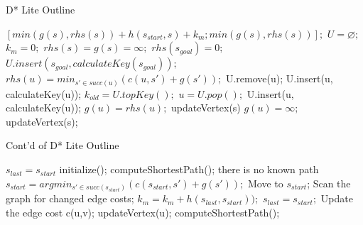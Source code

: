 \documentclass[10pt,journal]{IEEEtran}
\begin{document}
\begin{algorithm}
	\caption{D* Lite Outline}
	\label{algDLite-1}
	{\fontsize{9}{9}\selectfont
    \begin{algorithmic}[1] %
      	\State \Return $[min(g(s), rhs(s)) + h(s_{start},s) + k_{m} ; min(g(s), rhs(s))];$
      \EndFunction
   	  \Statex
      	\State $U = \varnothing;$
      	\State $k_{m} = 0;$
     		\State $rhs(s) = g(s) = \infty;$
     	\EndFor
      	\State $rhs(s_{goal}) = 0;$
      	\State $U.insert(s_{goal}, calculateKey(s_{goal}));$
	  \EndFunction
	  \Statex
   	  		\State $rhs(u) = min_{s' \in succ(u)}(c(u,s') + g(s'));$
   	  	\EndIf
   	  	 U.remove(u); \EndIf
   	  		\State U.insert(u, calculateKey(u));
   	  	\EndIf
   	  \EndFunction
	  \Statex	  
      		\State $k_{old} = U.topKey();$
      		\State $u = U.pop();$
   		  		\State U.insert(u, calculateKey(u));
    	      	\State $g(u) = rhs(u);$
				 updateVertex(s) \EndFor
			\Else
				\State $g(u) = \infty;$
				 updateVertex(s); \EndFor
	   	  	\EndIf
      	\EndWhile  	  
  	  \EndFunction
    \end{algorithmic}}
\end{algorithm}

\begin{algorithm}
	\caption{Cont'd of D* Lite Outline}
	\label{algDLite-2}
	{\fontsize{9}{9}\selectfont
    \begin{algorithmic}[1] %
	  	\State $s_{last} = s_{start}$
      	\State initialize();
      	\State computeShortestPath();
			 there is no known path \EndIf
			\State $s_{start} = argmin_{s' \in succ(s_{start})}(c(s_{start},s') + g(s'));$
			\State Move to $s_{start}$;
   	      	\State Scan the graph for changed edge costs;
    	      		\State $k_{m} = k_{m} + h(s_{last}, s_{start}));$
      			  	\State $s_{last} = s_{start};$
    	      			\State Update the edge cost c(u,v);
    	      			\State updateVertex(u);
    	      		\EndFor
		      		\State computeShortestPath();
    	      	\EndIf
		\EndWhile
  	  \EndFunction
    \end{algorithmic}}
\end{algorithm}
\end{document}
